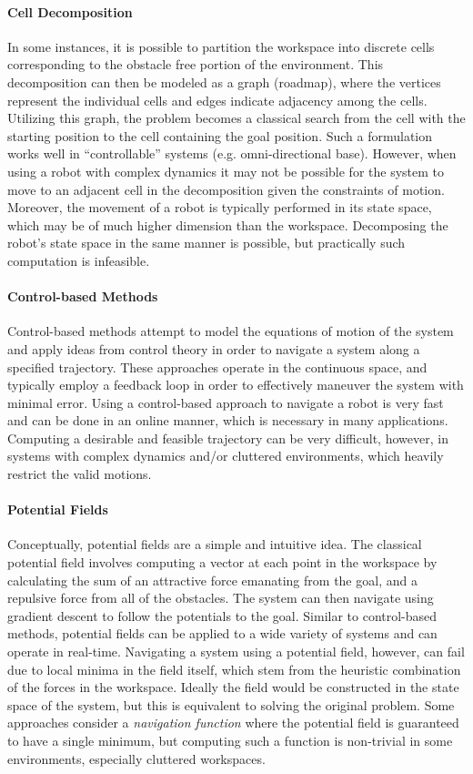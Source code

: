 \paragraph {Cell Decomposition}
In some instances, it is possible to partition the workspace into discrete
cells corresponding to the obstacle free portion of the environment.  This
decomposition can then be modeled as a graph (roadmap), where the vertices 
represent the individual cells and edges indicate adjacency among the cells. 
Utilizing this graph, the problem becomes a classical search from the cell with
the starting position to the cell containing the goal position.  Such a 
formulation works well in ``controllable'' systems (e.g. omni-directional base).
However, when using a robot with complex dynamics it may not be possible for the
system to move to an adjacent cell in the decomposition given the constraints 
of motion.  Moreover, the movement of a robot is typically performed in its 
state space, which may be of much higher dimension than the workspace.  
Decomposing the robot's state space in the same manner is possible, but 
practically such computation is infeasible.

\paragraph {Control-based Methods}
Control-based methods attempt to model the equations of motion of the system
and apply ideas from control theory in order to navigate a system along a
specified trajectory.  These approaches operate in the continuous space, and
typically employ a feedback loop in order to effectively maneuver the system 
with minimal error.  Using a control-based approach to navigate a robot is
very fast and can be done in an online manner, which is necessary in many 
applications.  Computing a desirable and feasible trajectory can be very 
difficult, however, in systems with complex dynamics and/or cluttered 
environments, which heavily restrict the valid motions.

\paragraph {Potential Fields}
Conceptually, potential fields are a simple and intuitive idea.  The classical
potential field involves computing a vector at each point in the workspace by 
calculating the sum of an attractive force emanating from the goal, and a 
repulsive force from all of the obstacles. The system can then navigate 
using gradient descent to follow the potentials to the goal. Similar to 
control-based methods, potential fields can be applied to a wide variety of 
systems and can operate in real-time.  Navigating a system using a potential 
field, however, can fail due to local minima in the field itself, which stem 
from the heuristic combination of the forces in the workspace.  Ideally the 
field would be constructed in the state space of the system, but this is 
equivalent to solving the original problem.  Some approaches consider a {\it 
navigation function} where the potential field is guaranteed to have a single 
minimum, but computing such a function is non-trivial in some environments, 
especially cluttered workspaces.

